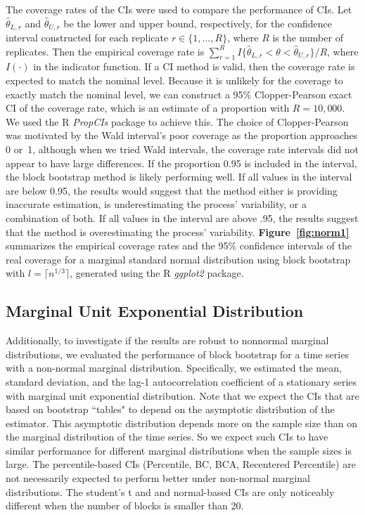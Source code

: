 \documentclass[10pt]{article}
\begin{document}
The coverage rates of the CIs were used to compare the performance of CIs. Let
$\hat\theta_{L, r}$ and $\hat\theta_{U, r}$ be the lower and upper bound,
respectively, for the confidence interval constructed for each replicate
$r \in \{1, \ldots, R\}$, where $R$ is the number of replicates. Then
the empirical coverage rate is
$ \sum_{r=1}^{R} I\{\hat\theta_{L, r} < \theta < \hat\theta_{U, r}
\}/R$, where $I(\cdot)$ in the indicator function.
If a CI method is valid, then the coverage rate is
expected to match the nominal level. Because it is unlikely for the coverage to 
exactly match the nominal level, we can construct a 95\% Clopper-Pearson
exact CI of the coverage rate,\citep{clopper1934use}
which is an estimate of a proportion with $R = 10,000$. We used the
R \textsl{PropCIs} package to achieve this.\citep{PropCIs}
The choice of Clopper-Pearson was motivated by the Wald 
interval's poor coverage as the proportion approaches 0
or~1,\citep{brown2001interval}
although when we tried Wald intervals, the coverage
rate intervals did not appear to have large differences. If the proportion 0.95
is included in the interval, the block bootstrap method is likely performing 
well. If all values in the interval are below 0.95, the results would suggest 
that the method either is providing inaccurate estimation, is underestimating 
the process' variability, or a combination of both. If all values in the 
interval are above .95, the results suggest that the method is overestimating 
the process' variability. \textbf{Figure~\ref{fig:norm1}} 
summarizes the empirical coverage rates and the 95\% confidence intervals of the 
real coverage for a marginal standard normal distribution using block bootstrap
with $l = \lceil n^{1/3} \rceil$, generated using the 
R \textsl{ggplot2} package.\citep{ggplot2}


\subsection*{Marginal Unit Exponential Distribution}
Additionally, to investigate if the results are robust to nonnormal
marginal distributions, we evaluated the performance of block
bootstrap for a time series with a non-normal marginal
distribution. Specifically, we estimated the mean, standard deviation,
and the lag-1 autocorrelation coefficient of a stationary series with
marginal unit exponential distribution. Note that we expect the CIs
that are based on bootstrap ``tables" to depend on the 
asymptotic distribution of the estimator.  This asymptotic
distribution depends more on the sample size than on the marginal
distribution of the time series. So we expect such CIs to 
have similar performance for different marginal distributions when the
sample sizes is large.  The percentile-based CIs (Percentile, BC, BCA,
Recentered Percentile) are not necessarily expected to perform
better under non-normal marginal distributions. The student's t and
and normal-based CIs are only noticeably different when the number of
blocks is smaller than 20.
\end{document}
